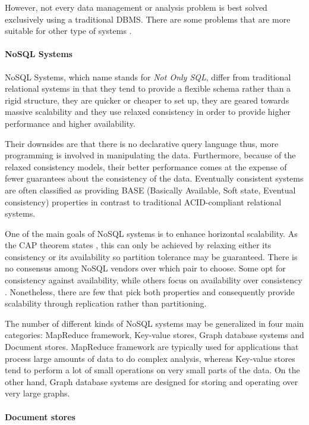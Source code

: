 However, not every data management or analysis problem is best solved exclusively using a traditional DBMS. There are some problems that are more suitable for other type of systems \cite{NoSQL-use-cases}.

\paragraph{NoSQL Systems}

NoSQL Systems, which name stands for \textit{Not Only SQL}, differ from traditional relational systems in that they tend to provide a flexible schema rather than a rigid structure, they are quicker or cheaper to set up, they are geared towards massive scalability and they use relaxed consistency in order to provide higher performance and higher availability.

Their downsides are that there is no declarative query language thus, more programming is involved in manipulating the data. Furthermore, because of the relaxed consistency models, their better performance comes at the expense of fewer guarantees about the consistency of the data. Eventually consistent systems are often classified as providing BASE (Basically Available, Soft state, Eventual consistency) properties in contrast to traditional ACID-compliant relational systems.

One of the main goals of NoSQL systems is to enhance horizontal scalability. As the CAP theorem states \cite{CAP-theorem}\cite{CAP:online}, this can only be achieved by relaxing either its consistency or its availability so partition tolerance may be guaranteed. There is no consensus among NoSQL vendors over which pair to choose. Some opt for consistency against availability, while others focus on availability over consistency \cite{CAP-NoSQL}. Nonetheless, there are few that pick both properties and consequently provide scalability through replication rather than partitioning.

The number of different kinds of NoSQL systems may be generalized in four main categories: MapReduce framework, Key-value stores, Graph database systems and Document stores. MapReduce framework are typically used for applications that process large amounts of data to do complex analysis, whereas Key-value stores tend to perform a lot of small operations on very small parts of the data. On the other hand, Graph database systems are designed for storing and operating over very large graphs.

\paragraph{Document stores}

